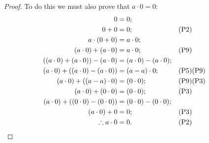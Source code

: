 \documentclass{article}
\begin{document}
\begin{enumerate}[(i).]
            \begin{proof}
                To do this we must also prove that \(a \cdot 0 = 0\):
                \begin{align*}
                    0 &= 0 \text{;}\\
                    0 + 0 &= 0 \text{;} &&\text{(P2)}\\
                    a \cdot (0 + 0) &= a \cdot 0 \text{;}\\
                    (a \cdot 0) + (a \cdot 0) &= a \cdot 0 \text{;} &&\text{(P9)}\\
                    ((a \cdot 0) + (a \cdot 0)) - (a \cdot 0) &= (a \cdot 0) - (a \cdot 0) \text{;}\\
                    (a \cdot 0) + ((a \cdot 0) - (a \cdot 0)) &= (a - a) \cdot 0 \text{;} &&\text{(P5)(P9)}\\
                    (a \cdot 0) + ((a - a) \cdot 0) &= (0 \cdot 0) \text{;} &&\text{(P9)(P3)}\\
                    (a \cdot 0) + (0 \cdot 0) &= (0 \cdot 0) \text{;} &&\text{(P3)}\\
                    (a \cdot 0) + ((0 \cdot 0) - (0 \cdot 0)) &= (0 \cdot 0) - (0 \cdot 0) \text{;}\\
                    (a \cdot 0) + 0 &= 0 \text{;} &&\text{(P3)}\\
                    \therefore a \cdot 0 &= 0 \text{.} &&\text{(P2)} \qedhere
                \end{align*}
            \end{proof}
            

\end{enumerate}
\end{document}
